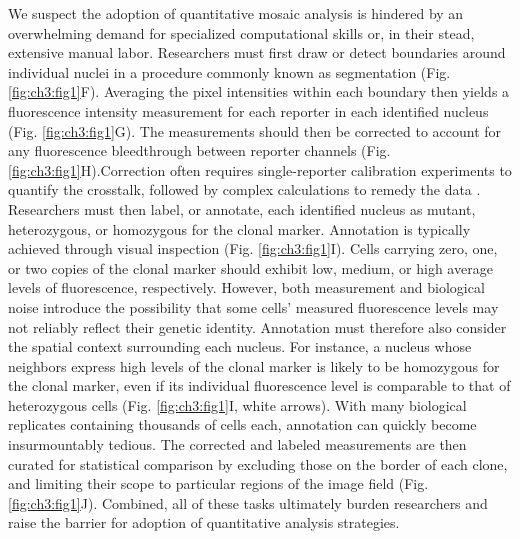 We suspect the adoption of quantitative mosaic analysis is hindered by an overwhelming demand for specialized computational skills or, in their stead, extensive manual labor. Researchers must first draw or detect boundaries around individual nuclei in a procedure commonly known as segmentation (Fig. \ref{fig:ch3:fig1}F). Averaging the pixel intensities within each boundary then yields a fluorescence intensity measurement for each reporter in each identified nucleus (Fig. \ref{fig:ch3:fig1}G). The measurements should then be corrected to account for any fluorescence bleedthrough between reporter channels (Fig. \ref{fig:ch3:fig1}H).Correction often requires single-reporter calibration experiments to quantify the crosstalk, followed by complex calculations to remedy the data \cite{Bacia2012,Elangovan2003}. Researchers must then label, or annotate, each identified nucleus as mutant, heterozygous, or homozygous for the clonal marker. Annotation is typically achieved through visual inspection (Fig. \ref{fig:ch3:fig1}I). Cells carrying zero, one, or two copies of the clonal marker should exhibit low, medium, or high average levels of fluorescence, respectively. However, both measurement and biological noise introduce the possibility that some cells’ measured fluorescence levels may not reliably reflect their genetic identity. Annotation must therefore also consider the spatial context surrounding each nucleus. For instance, a nucleus whose neighbors express high levels of the clonal marker is likely to be homozygous for the clonal marker, even if its individual fluorescence level is comparable to that of heterozygous cells (Fig. \ref{fig:ch3:fig1}I, white arrows). With many biological replicates containing thousands of cells each, annotation can quickly become insurmountably tedious. The corrected and labeled measurements are then curated for statistical comparison by excluding those on the border of each clone, and limiting their scope to particular regions of the image field (Fig. \ref{fig:ch3:fig1}J). Combined, all of these tasks ultimately burden researchers and raise the barrier for adoption of quantitative analysis strategies. 

